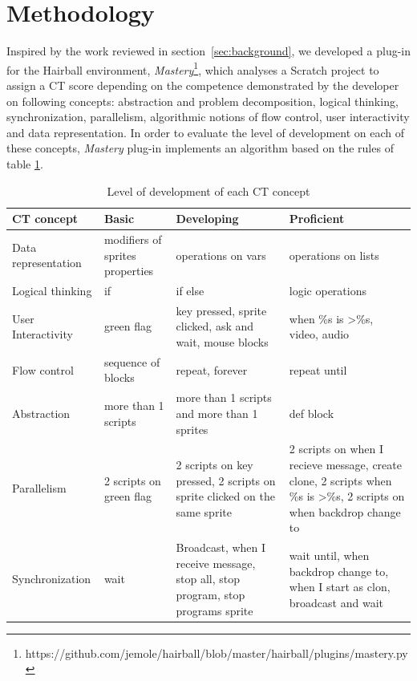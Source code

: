 \documentclass[a4paper,11pt]{article}
\begin{document}
\section{Methodology}
\label{sec:methodology}
Inspired by the work reviewed in section~\ref{sec:background}, we developed a plug-in for the Hairball environment, \textit{Mastery}\footnote{https://github.com/jemole/hairball/blob/master/hairball/plugins/mastery.py}, which analyses a Scratch project to assign a CT score depending on the competence demonstrated by the developer on following concepts: abstraction and problem decomposition, logical thinking, synchronization, parallelism, algorithmic notions of flow control, user interactivity and data representation. In order to evaluate the level of development on each of these concepts, \textit{Mastery} plug-in implements an algorithm based on the rules of table \ref{table:CTscore}.
\begin{table}[t]
\centering
\caption{Level of development of each CT concept}
\begin{tabular}{p{2.5cm}p{2.7cm}p{3cm}p{4cm}}
\toprule
CT concept & Basic & Developing & Proficient\\ \midrule 
Data representation & modifiers of sprites properties &
operations on vars & operations on lists  \\
Logical thinking & if & if else & logic operations \\ 
User Interactivity & green flag & key pressed, sprite clicked, ask and wait,
mouse blocks & when \%s is \textgreater \%s, video, audio \\ 
Flow control & sequence of blocks & repeat, forever & repeat until \\ 
Abstraction & more than 1 scripts & more than 1 scripts and more than 1 sprites & def block\\
Parallelism & 2 scripts on green flag & 2 scripts on key pressed, 2 scripts on sprite clicked on the same sprite & 2 scripts on when I recieve message, create clone, 2 scripts when \%s is \textgreater \%s, 2 scripts on when backdrop change to \\
Synchronization & wait & Broadcast, when I receive message, stop all, stop program, stop programs sprite & wait until, when backdrop change to, when I start as clon, broadcast and wait \\ \bottomrule
\end{tabular}
\label{table:CTscore}
\end{table}
\end{document}
